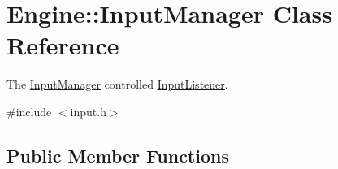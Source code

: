 \hypertarget{classEngine_1_1InputManager}{}\section{Engine\+:\+:Input\+Manager Class Reference}
\label{classEngine_1_1InputManager}


The \hyperlink{classEngine_1_1InputManager}{Input\+Manager} controlled \hyperlink{classEngine_1_1InputListener}{Input\+Listener}.  




{\ttfamily \#include $<$input.\+h$>$}

\subsection*{Public Member Functions}
